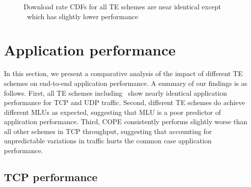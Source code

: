 \begin{figure}[tbh]
\begin{center}
  \end{center} 
  \caption{Download rate CDFs for all TE schemes are near identical except \cope\ which has slightly lower performance}
  \label{fig:throughputs_CDF}
\end{figure}

\section{Application performance}
\label{sec:app_performance}
In this section, we present a comparative analysis of the impact of different TE schemes on end-to-end application performance. A summary of our findings is as follows. First, all TE schemes  including \invcap\ show nearly identical application performance for TCP and UDP traffic. Second, different TE schemes do achieve different MLUs as expected, suggesting that MLU is a poor predictor of application performance. Third, COPE consistently performs slightly worse than all other schemes in TCP throughput, suggesting that accounting for unpredictable variations in traffic hurts the common case application performance.





\subsection{TCP performance}


